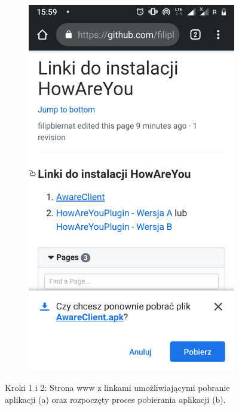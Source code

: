 \begin{enumerate}
\begin{figure}[H]
\begin{subfigure}{0.35\textwidth}
			\subcaption{\label{subfigure_a}}
		\end{subfigure}
		\begin{subfigure}{0.35\textwidth}
			\centering
			\includegraphics[scale=0.14]{dodatekA/2_2.png}
			\subcaption{\label{subfigure_b}}
		\end{subfigure}
		\caption{ Kroki 1 i 2: Strona www z linkami umożliwiającymi pobranie aplikacji (a) oraz rozpoczęty proces pobierania aplikacji (b).}
	\end{figure}
	\clearpage 
	

\end{enumerate}
